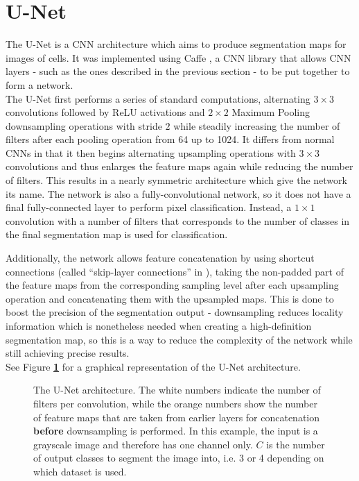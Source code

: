 	\section {U-Net}
The U-Net \cite{unet} is a CNN architecture which aims to produce segmentation maps for images of cells. It was implemented using Caffe \cite{caffe}, a CNN library that allows CNN layers - such as the ones described in the previous section - to be put together to form a network.\\

The U-Net first performs a series of standard computations, alternating $3 \times 3$ convolutions followed by ReLU activations and $2 \times 2$ Maximum Pooling downsampling operations with stride $2$ while steadily increasing the number of filters after each pooling operation from 64 up to 1024. It differs from normal CNNs in that it then begins alternating upsampling operations with $3 \times 3$ convolutions and thus enlarges the feature maps again while reducing the number of filters. This results in a nearly symmetric architecture which give the network its name. The network is also a fully-convolutional network, so it does not have a final fully-connected layer to perform pixel classification. Instead, a $1 \times 1$ convolution with a number of filters that corresponds to the number of classes in the final segmentation map is used for classification.

Additionally, the network allows feature concatenation by using shortcut connections (called ``skip-layer connections'' in \cite{bishop_pattern}), taking the non-padded part of the feature maps from the corresponding sampling level after each upsampling operation and concatenating them with the upsampled maps. This is done to boost the precision of the segmentation output - downsampling reduces locality information which is nonetheless needed when creating a high-definition segmentation map, so this is a way to reduce the complexity of the network while still achieving precise results.\\

See Figure \textbf{\ref{fig:unet_arch}} for a graphical representation of the U-Net architecture.\\

\begin {figure}[!ht]
	\scalebox{0.75}{}
	\caption[The U-Net architecture.]{The U-Net architecture. The white numbers indicate the number of filters per convolution, while the orange numbers show the number of feature maps that are taken from earlier layers for concatenation \textbf{before} downsampling is performed. In this example, the input is a grayscale image and therefore has one channel only. $C$ is the number of output classes to segment the image into, i.e. 3 or 4 depending on which dataset is used.}
	\label{fig:unet_arch}
\end {figure}
